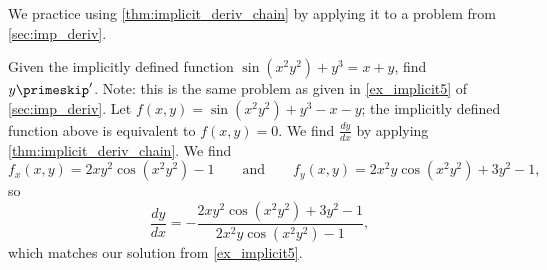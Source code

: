 We practice using \autoref{thm:implicit_deriv_chain} by applying it to a problem from \autoref{sec:imp_deriv}.

\begin{example}\label{ex_mchain5}
Given the implicitly defined function $\sin(x^2y^2)+y^3=x+y$, find $y\primeskip'$. Note: this is the same problem as given in \autoref{ex_implicit5} of \autoref{sec:imp_deriv}.
\solution
Let $f(x,y) = \sin(x^2y^2)+y^3-x-y$; the implicitly defined function above is equivalent to $f(x,y)=0$. We find $\frac{dy}{dx}$ by applying \autoref{thm:implicit_deriv_chain}. We find 
\[f_x(x,y) = 2xy^2\cos(x^2y^2)-1\qquad \text{and}\qquad f_y(x,y) = 2x^2y\cos(x^2y^2)+3y^2-1,\]
so 
\[\frac{dy}{dx} = -\frac{2xy^2\cos(x^2y^2)+3y^2-1}{2x^2y\cos(x^2y^2)-1},\]
which matches our solution from \autoref{ex_implicit5}.
\end{example}


